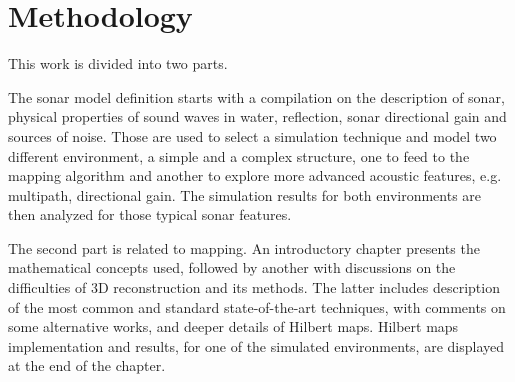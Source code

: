 

\section{Methodology}
 


% 


This work is divided into two parts.

The sonar model definition starts with a compilation on the description of
sonar, physical properties of sound waves in water, reflection, sonar
directional gain and sources of noise. Those are used to select a simulation
technique and model two different environment, a simple and a complex
structure, one to feed to the mapping algorithm and another to explore more
advanced acoustic features, e.g. multipath, directional gain. The simulation
results for both environments are then analyzed for those typical sonar
features.

The second part is related to mapping. An introductory chapter presents
the mathematical concepts used, followed by another with discussions on the
difficulties of 3D reconstruction and its methods. The latter includes description
of the most common and standard state-of-the-art techniques, with comments on
some alternative works, and deeper details of Hilbert maps. Hilbert maps
implementation and results, for one of the simulated environments, are
displayed at the end of the chapter.



